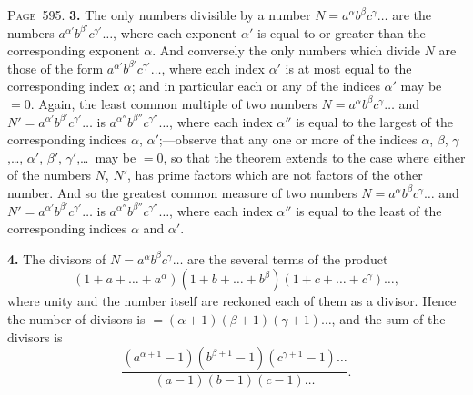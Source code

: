 \documentclass[11pt,a4paper]{article}
\theoremstyle{definition}
\begin{document}
\newpage
\noindent\textsc{Page~595.} \textbf{3.} The only numbers divisible by a number $N=a^\alpha b^\beta c^\gamma\ldots$ are the numbers $a^{\alpha'}b^{\beta'}c^{\gamma'}\ldots$, where each exponent $\alpha'$ is equal to or greater than the corresponding exponent $\alpha$. And conversely the only numbers which divide $N$ are those of the form $a^{\alpha'}b^{\beta'}c^{\gamma'}\ldots$, where each index $\alpha'$ is at most equal to the corresponding index $\alpha$; and in particular each or any of the indices $\alpha'$ may be $=0$. Again, the least common multiple of two numbers $N=a^\alpha b^\beta c^\gamma\ldots$ and $N'=a^{\alpha'}b^{\beta'}c^{\gamma'}\ldots$ is $a^{\alpha''}b^{\beta''}c^{\gamma''}\ldots$, where each index $\alpha''$ is equal to the largest of the corresponding indices $\alpha$, $\alpha'$;---observe that any one or more of the indices $\alpha$, $\beta$, $\gamma$,\ldots, $\alpha'$, $\beta'$, $\gamma'$,\ldots\ may be $=0$, so that the theorem extends to the case where either of the numbers $N$, $N'$, has prime factors which are not factors of the other number. And so the greatest common measure of two numbers $N=a^\alpha b^\beta c^\gamma\ldots$ and $N'=a^{\alpha'}b^{\beta'}c^{\gamma'}\ldots$ is $a^{\alpha''}b^{\beta''}c^{\gamma''}\ldots$, where each index $\alpha''$ is equal to the least of the corresponding indices $\alpha$ and $\alpha'$.

\textbf{4.} The divisors of $N=a^\alpha b^\beta c^\gamma\ldots$ are the several terms of the product
\[
(1+a+\ldots+a^\alpha)(1+b+\ldots+b^\beta)(1+c+\ldots+c^\gamma)\ldots,
\]
where unity and the number itself are reckoned each of them as a divisor. Hence the number of divisors is $=(\alpha+1)(\beta+1)(\gamma+1)\ldots$, and the sum of the divisors is
\[
\frac{(a^{\alpha+1}-1)(b^{\beta+1}-1)(c^{\gamma+1}-1)\ldots}{(a-1)(b-1)(c-1)\ldots}.
\]
\end{document}
